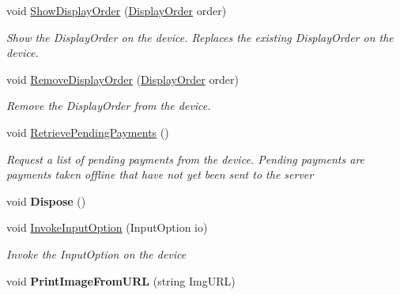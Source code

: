 \begin{DoxyCompactItemize}
void \hyperlink{classcom_1_1clover_1_1remotepay_1_1sdk_1_1_clover_connector_abfa384bfc0c016908d137e0332b7e06c}{Show\+Display\+Order} (\hyperlink{classcom_1_1clover_1_1remote_1_1order_1_1_display_order}{Display\+Order} order)
\begin{DoxyCompactList}\small\item\em Show the Display\+Order on the device. Replaces the existing Display\+Order on the device. \end{DoxyCompactList}\item 
void \hyperlink{classcom_1_1clover_1_1remotepay_1_1sdk_1_1_clover_connector_af5a1b2bddf01b44eaa40af3f8212451b}{Remove\+Display\+Order} (\hyperlink{classcom_1_1clover_1_1remote_1_1order_1_1_display_order}{Display\+Order} order)
\begin{DoxyCompactList}\small\item\em Remove the Display\+Order from the device. \end{DoxyCompactList}\item 
void \hyperlink{classcom_1_1clover_1_1remotepay_1_1sdk_1_1_clover_connector_a8ba5ef9b937ad8edc9cd5052826da2ed}{Retrieve\+Pending\+Payments} ()
\begin{DoxyCompactList}\small\item\em Request a list of pending payments from the device. Pending payments are payments taken offline that have not yet been sent to the server \end{DoxyCompactList}\item 
\mbox{\label{classcom_1_1clover_1_1remotepay_1_1sdk_1_1_clover_connector_a08a821f3352e90d381bccb650f3078b5}} 
void {\bfseries Dispose} ()
\item 
void \hyperlink{classcom_1_1clover_1_1remotepay_1_1sdk_1_1_clover_connector_a3dc88865e40a37997d2f593bf638512e}{Invoke\+Input\+Option} (Input\+Option io)
\begin{DoxyCompactList}\small\item\em Invoke the Input\+Option on the device \end{DoxyCompactList}\item 
\mbox{\label{classcom_1_1clover_1_1remotepay_1_1sdk_1_1_clover_connector_a5c19ccfff8c4f7ea04c426eb11b31a6a}} 
void {\bfseries Print\+Image\+From\+U\+RL} (string Img\+U\+RL)
\item 
\mbox{\label{classcom_1_1clover_1_1remotepay_1_1sdk_1_1_clover_connector_aa2a0ec7354431592cb9d82e0c93fac45}} 

\end{DoxyCompactItemize}
